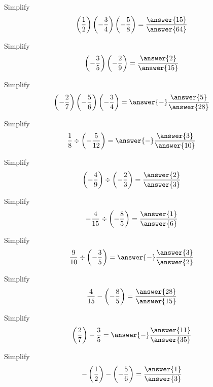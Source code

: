 \documentclass{ximera}
\begin{document}
\begin{problem}
Simplify
\[
\left(\frac{1}{2} \right) \left( - \frac{3}{4} \right)  \left( - \frac{5}{8} \right)  = \frac{\answer{15}}{\answer{64}}
\]
\end{problem}

\begin{problem}
Simplify
\[
\left( - \frac{3}{5}\right) \left( - \frac{2}{9} \right) = \frac{\answer{2}}{\answer{15}}
\]
\end{problem}

\begin{problem}
Simplify
\[
\left(-\frac{2}{7} \right) \left( - \frac{5}{6} \right)  \left( - \frac{3}{4} \right)  = \answer{-}\frac{\answer{5}}{\answer{28}}
\]
\end{problem}



\begin{problem}
Simplify
\[
\frac{1}{8} \div \left(-\frac{5}{12}\right) = \answer{-} \frac{\answer{3}}{\answer{10}}
\]
\end{problem}

\begin{problem}
Simplify
\[
\left(-\frac{4}{9}\right) \div \left(-\frac{2}{3}\right) = \frac{\answer{2}}{\answer{3}}
\]
\end{problem}

\begin{problem}
Simplify
\[
-\frac{4}{15} \div \left(-\frac{8}{5}\right) = \frac{\answer{1}}{\answer{6}}
\]
\end{problem}

\begin{problem}
Simplify
\[
\frac{9}{10} \div \left(-\frac{3}{5}\right) = \answer{-} \frac{\answer{3}}{\answer{2}}
\]
\end{problem}


\begin{problem}
Simplify
\[
\frac{4}{15} - \left(-\frac{8}{5}\right) = \frac{\answer{28}}{\answer{15}}
\]
\end{problem}

\begin{problem}
Simplify
\[
\left(\frac{2}{7}\right) - \frac{3}{5} = \answer{-} \frac{\answer{11}}{\answer{35}}
\]
\end{problem}

\begin{problem}
Simplify
\[
-\left(\frac{1}{2}\right) - \left(-\frac{5}{6}\right) = \frac{\answer{1}}{\answer{3}}
\]
\end{problem}
\end{document}
